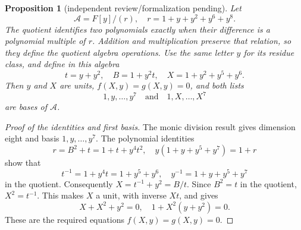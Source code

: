 \documentclass{article}
\newtheorem{proposition}{Proposition}
\begin{document}
\begin{proposition}[independent review\slash formalization pending]\label{prop:charge-algebra}
  Let
  \begin{equation}
    \mathcal{A} = F[y]/(r), \quad r = 1 + y + y^2 + y^6 + y^8.
  \end{equation}
  The quotient identifies two polynomials exactly when their difference is a polynomial
  multiple of \(r\). Addition and multiplication preserve that relation, so they define the
  quotient algebra operations. Use the same letter \(y\) for its residue class, and define in
  this algebra
  \begin{equation}
    t = y + y^2, \quad B = 1 + y^2 t, \quad
    X = 1 + y^2 + y^5 + y^6.
  \end{equation}
  Then \(y\) and \(X\) are units, \(f(X,y) = g(X,y) = 0\), and both lists
  \begin{equation}
    1, y, \dots, y^7 \quad \text{and} \quad 1, X, \dots, X^7
  \end{equation}
  are bases of \(\mathcal{A}\).
\end{proposition}

\begin{proof}[Proof of the identities and first basis]
%
  The monic division result gives dimension eight and basis \(1, y, \dots, y^7\). The
  polynomial identities
  \begin{equation}
    r = B^2 + t = 1 + t + y^4 t^2,
    \quad y(1 + y + y^5 + y^7) = 1 + r
  \end{equation}
  show that
  \begin{equation}
    t^{-1} = 1 + y^4 t = 1 + y^5 + y^6,
    \quad y^{-1} = 1 + y + y^5 + y^7
  \end{equation}
  in the quotient. Consequently \(X = t^{-1} + y^2 = B/t\). Since \(B^2 = t\) in the
  quotient, \(X^2 = t^{-1}\). This makes \(X\) a unit, with inverse \(Xt\), and gives
  \begin{equation}
    X + X^2 + y^2 = 0, \quad 1 + X^2(y + y^2) = 0.
  \end{equation}
  These are the required equations \(f(X,y) = g(X,y) = 0\).
\end{proof}
\end{document}

